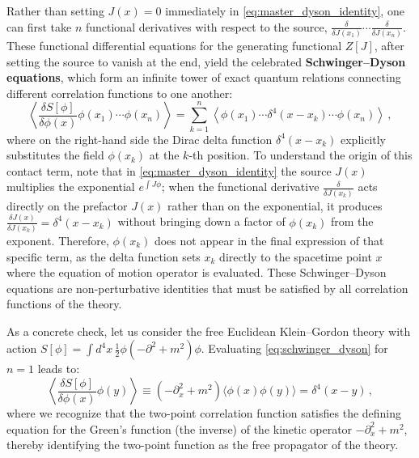 Rather than setting \(J(x) = 0\) immediately in \eqref{eq:master_dyson_identity}, one can first take \(n\) functional derivatives with respect to the source, \(\frac{\delta}{\delta J(x_1)} \cdots \frac{\delta}{\delta J(x_n)}\). These functional differential equations for the generating functional \(Z[J]\), after setting the source to vanish at the end, yield the celebrated \textbf{Schwinger--Dyson equations}, which form an infinite tower of exact quantum relations connecting different correlation functions to one another:
\begin{equation} \label{eq:schwinger_dyson}
    \boxed{\left\langle \frac{\delta S[\phi]}{\delta \phi(x)} \phi(x_1) \cdots \phi(x_n) \right\rangle = \sum_{k=1}^n \left\langle \phi(x_1) \cdots \delta^4(x - x_k) \cdots \phi(x_n) \right\rangle} \, ,
\end{equation}
where on the right-hand side the Dirac delta function \(\delta^4(x - x_k)\) explicitly substitutes the field \(\phi(x_k)\) at the \(k\)-th position. To understand the origin of this contact term, note that in \eqref{eq:master_dyson_identity} the source \(J(x)\) multiplies the exponential \(e^{\int J \phi}\); when the functional derivative \(\frac{\delta}{\delta J(x_k)}\) acts directly on the prefactor \(J(x)\) rather than on the exponential, it produces \(\frac{\delta J(x)}{\delta J(x_k)} = \delta^4(x - x_k)\) without bringing down a factor of \(\phi(x_k)\) from the exponent. Therefore, \(\phi(x_k)\) does not appear in the final expression of that specific term, as the delta function sets \(x_k\) directly to the spacetime point \(x\) where the equation of motion operator is evaluated. These Schwinger--Dyson equations are non-perturbative identities that must be satisfied by all correlation functions of the theory.

As a concrete check, let us consider the free Euclidean Klein--Gordon theory with action \(S[\phi] = \int d^4x \, \frac{1}{2}\phi(-\partial^2 + m^2)\phi\). Evaluating \eqref{eq:schwinger_dyson} for \(n=1\) leads to:
\begin{equation} \label{eq:klein_gordon_sd}
    \left\langle \frac{\delta S[\phi]}{\delta \phi(x)} \phi(y) \right\rangle \equiv (-\partial_x^2 + m^2) \langle \phi(x)\phi(y) \rangle = \delta^4(x - y) \, ,
\end{equation}
where we recognize that the two-point correlation function satisfies the defining equation for the Green's function (the inverse) of the kinetic operator \(-\partial_x^2 + m^2\), thereby identifying the two-point function as the free propagator of the theory.

